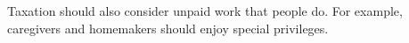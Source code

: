 Taxation should also consider unpaid work that people do. For example, caregivers and homemakers should enjoy special privileges.
